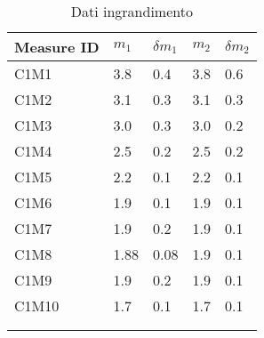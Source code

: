 \begin{longtable}[]{@{}lllll@{}}
    \toprule
    Measure ID & $m_1$ & $\delta m_1$ & $m_2$ & $\delta m_2$ \tabularnewline
    \midrule
    \endhead
    C1M1 & 3.8 & 0.4 & 3.8 & 0.6 \tabularnewline
    C1M2 & 3.1 & 0.3 & 3.1 & 0.3 \tabularnewline
    C1M3 & 3.0 & 0.3 & 3.0 & 0.2 \tabularnewline
    C1M4 & 2.5 & 0.2 & 2.5 & 0.2 \tabularnewline
    C1M5 & 2.2 & 0.1 & 2.2 & 0.1 \tabularnewline
    C1M6 & 1.9 & 0.1 & 1.9 & 0.1 \tabularnewline
    C1M7 & 1.9 & 0.2 & 1.9 & 0.1 \tabularnewline
    C1M8 & 1.88 & 0.08 & 1.9 & 0.1 \tabularnewline
    C1M9 & 1.9 & 0.2 & 1.9 & 0.1 \tabularnewline
    C1M10 & 1.7 & 0.1 & 1.7 & 0.1 \tabularnewline
    \bottomrule
    \label{tab:ingrandimento}
    \\
    \caption{Dati ingrandimento}
 \end{longtable}